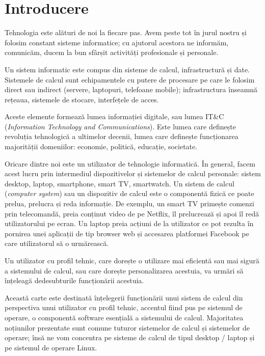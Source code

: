 
\chapter{Introducere}
\label{ch:intro}

Tehnologia este alături de noi la fiecare pas.
Avem peste tot în jurul nostru și folosim constant sisteme informatice;
cu ajutorul acestora ne informăm, comunicăm, ducem la bun sfârșit activități profesionale și personale.

Un sistem informatic este compus din sisteme de calcul, infrastructură și date.
Sistemele de calcul sunt echipamentele cu putere de procesare pe care le folosim direct sau indirect (servere, laptopuri, telefoane mobile);
infrastructura înseamnă rețeaua, sistemele de stocare, interfețele de acces.

Aceste elemente formează lumea informației digitale, sau lumea IT\&C (\textit{Information Technology and Communications}).
Este lumea care definește revoluția tehnologică a ultimelor decenii, lumea care definește funcționarea majorității domeniilor: economie, politică, educație, societate.

Oricare dintre noi este un utilizator de tehnologie informatică.
În general, facem acest lucru prin intermediul dispozitivelor și sistemelor de calcul personale: sistem desktop, laptop, smartphone, smart TV, smartwatch.
Un sistem de calcul (\textit{computer system}) sau un dispozitiv de calcul este o componentă fizică ce poate prelua, prelucra și reda informație.
De exemplu, un smart TV primește comenzi prin telecomandă, preia conținut video de pe Netflix, îl prelucrează și apoi îl redă utilizatorului pe ecran.
Un laptop preia acțiuni de la utilizator ce pot rezulta în pornirea unei aplicații de tip browser web și accesarea platformei Facebook pe care utilizatorul să o urmărească.

Un utilizator cu profil tehnic, care dorește o utilizare mai eficientă sau mai sigură a sistemului de calcul, sau care dorește personalizarea acestuia, va urmări să înțeleagă dedesubturile funcționării acestuia.

Această carte este destinată înțelegerii funcționării unui sistem de calcul din perspectiva unui utilizator cu profil tehnic, accentul fiind pus pe sistemul de operare, o componentă software esențială a sistemului de calcul.
Majoritatea noțiunilor prezentate sunt comune tuturor sistemelor de calcul și sistemelor de operare;
însă ne vom concentra pe sisteme de calcul de tipul desktop / laptop și pe sistemul de operare Linux.

